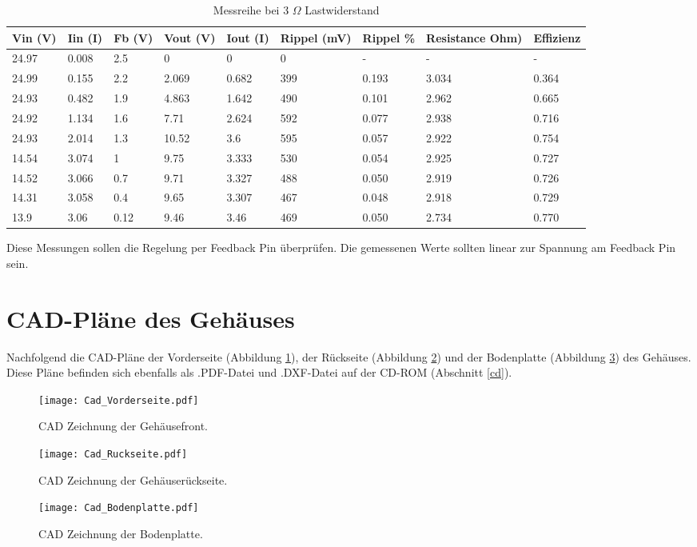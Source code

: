 \begin{table}[h]
\centering
\begin{tabular}{|l|l|l|l|l|l|l|l|l|}
\hline
\multicolumn{1}{|c|}{Vin (V)} & \multicolumn{1}{c|}{Iin (I)} & \multicolumn{1}{c|}{Fb (V)} & \multicolumn{1}{c|}{Vout (V)} & \multicolumn{1}{c|}{Iout (I)} & \multicolumn{1}{c|}{Rippel (mV)} & \multicolumn{1}{c|}{Rippel \%} & \multicolumn{1}{c|}{Resistance Ohm)} & \multicolumn{1}{c|}{Effizienz} \\ \hline
24.97 & 0.008 & 2.5 & 0 & 0 & 0 & - & - & - \\ \hline
24.99 & 0.155 & 2.2 & 2.069 & 0.682 & 399 & 0.193 & 3.034 & 0.364 \\ \hline
24.93 & 0.482 & 1.9 & 4.863 & 1.642 & 490 & 0.101 & 2.962 & 0.665 \\ \hline
24.92 & 1.134 & 1.6 & 7.71 & 2.624 & 592 & 0.077 & 2.938 & 0.716 \\ \hline
24.93 & 2.014 & 1.3 & 10.52 & 3.6 & 595 & 0.057 & 2.922 & 0.754 \\ \hline
14.54 & 3.074 & 1 & 9.75 & 3.333 & 530 & 0.054 & 2.925 & 0.727 \\ \hline
14.52 & 3.066 & 0.7 & 9.71 & 3.327 & 488 & 0.050 & 2.919 & 0.726 \\ \hline
14.31 & 3.058 & 0.4 & 9.65 & 3.307 & 467 & 0.048 & 2.918 & 0.729 \\ \hline
13.9 & 3.06 & 0.12 & 9.46 & 3.46 & 469 & 0.050 & 2.734 & 0.770 \\ \hline
\end{tabular}
\caption{Messreihe bei 3 $\Omega$ Lastwiderstand}
\label{fig::Res3}
\end{table}

Diese Messungen sollen die Regelung per Feedback Pin überprüfen. Die gemessenen Werte sollten linear zur Spannung am Feedback Pin sein.
\newpage

\section{CAD-Pläne des Gehäuses}\label{cad}
Nachfolgend die CAD-Pläne der Vorderseite (Abbildung \ref{fig:Cad_Vorderseite}), der Rückseite (Abbildung \ref{fig:Cad_Ruckseite}) und der Bodenplatte (Abbildung \ref{fig:Cad_Bodenplatte}) des Gehäuses. Diese Pläne befinden sich ebenfalls als .PDF-Datei und .DXF-Datei auf der CD-ROM (Abschnitt \ref{cd}).

\begin{figure}[h]
	\centering
		\texttt{[image: Cad\_Vorderseite.pdf]}
	\caption{CAD Zeichnung der Gehäusefront.}
	\label{fig:Cad_Vorderseite}
\end{figure}

\begin{figure}[h]
	\centering
		\texttt{[image: Cad\_Ruckseite.pdf]}
	\caption{CAD Zeichnung der Gehäuserückseite.}
	\label{fig:Cad_Ruckseite}
\end{figure}

\begin{figure}[h]
	\centering
		\texttt{[image: Cad\_Bodenplatte.pdf]}
	\caption{CAD Zeichnung der Bodenplatte.}
	\label{fig:Cad_Bodenplatte}
\end{figure}


